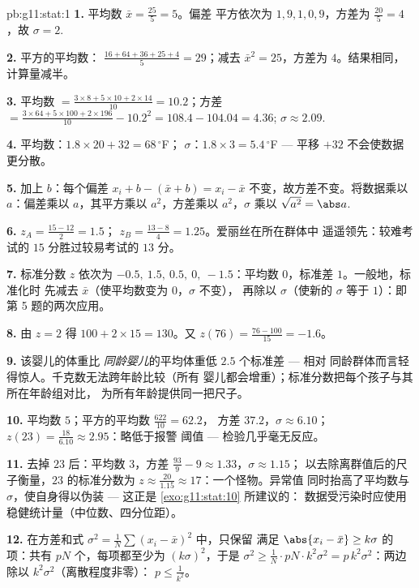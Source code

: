 \begin{solution}{pb:g11:stat:1}
\textbf{1.} 平均数 $\bar x = \frac{25}{5} = 5$。偏差
平方依次为 $1, 9, 1, 0, 9$，方差为 $\frac{20}{5} = 4$，故
$\sigma = 2$.

\textbf{2.} 平方的平均数：
$\frac{16 + 64 + 36 + 25 + 4}{5} = 29$；减去
$\bar x^2 = 25$，方差为 $4$。结果相同，计算量减半。

\textbf{3.} 平均数 $= \frac{3 \times 8 + 5 \times 10 + 2 \times
14}{10} = 10.2$；方差 $= \frac{3 \times 64 + 5 \times 100 +
2 \times 196}{10} - 10.2^2 = 108.4 - 104.04 = 4.36$;
$\sigma \approx 2.09$.

\textbf{4.} 平均数：$1.8 \times 20 + 32 = 68\,^\circ$F；
$\sigma$：$1.8 \times 3 = 5.4\,^\circ$F --- 平移 $+32$
不会使数据更分散。

\textbf{5.} 加上 $b$：每个偏差 $x_i + b - (\bar x + b)
= x_i - \bar x$ 不变，故方差不变。将数据乘以
$a$：偏差乘以 $a$，其平方乘以
$a^2$，方差乘以 $a^2$，$\sigma$ 乘以
$\sqrt{a^2} = \abs a$.

\textbf{6.} $z_A = \frac{15 - 12}{2} = 1.5$；
$z_B = \frac{13 - 8}{4} = 1.25$。爱丽丝在所在群体中
遥遥领先：较难考试的 $15$ 分胜过较易考试的 $13$ 分。

\textbf{7.} 标准分数 $z$ 依次为 $-0.5,\ 1.5,\ 0.5,\ 0,\ -1.5$：平均数
$0$，标准差 $1$。一般地，标准化时
先减去 $\bar x$（使平均数变为 $0$，$\sigma$ 不变），
再除以 $\sigma$（使新的 $\sigma$ 等于
$1$）：即第 5 题的两次应用。

\textbf{8.} 由 $z = 2$ 得 $100 + 2 \times 15 = 130$。又
$z(76) = \frac{76 - 100}{15} = -1.6$。

\textbf{9.} 该婴儿的体重比
\emph{同龄婴儿}的平均体重低 $2.5$ 个标准差 --- 相对
同龄群体而言轻得惊人。千克数无法跨年龄比较（所有
婴儿都会增重）；标准分数把每个孩子与其所在年龄组对比，
为所有年龄提供同一把尺子。

\textbf{10.} 平均数 $5$；平方的平均数 $\frac{622}{10} = 62.2$，
方差 $37.2$，$\sigma \approx 6.10$；
$z(23) = \frac{18}{6.10} \approx 2.95$：略低于报警
阈值 --- 检验几乎毫无反应。

\textbf{11.} 去掉 $23$ 后：平均数 $3$，方差
$\frac{93}{9} - 9 \approx 1.33$，$\sigma \approx 1.15$；
以去除离群值后的尺子衡量，$23$ 的标准分数为
$z \approx \frac{20}{1.15} \approx 17$：一个怪物。异常值
同时抬高了平均数与 $\sigma$，使自身得以伪装 ---
这正是 \cref{exo:g11:stat:10} 所建议的：
数据受污染时应使用稳健统计量（中位数、四分位距）。

\textbf{12.} 在方差和式
$\sigma^2 = \frac1N \sum (x_i - \bar x)^2$ 中，只保留
满足 $\abs{x_i - \bar x} \geq k\sigma$ 的项：共有 $pN$
个，每项都至少为 $(k\sigma)^2$，于是
$\sigma^2 \geq \frac{1}{N} \cdot pN \cdot k^2\sigma^2 =
p\,k^2\sigma^2$：两边除以 $k^2 \sigma^2$（离散程度非零）：
$p \leq \frac{1}{k^2}$。


\end{solution}
